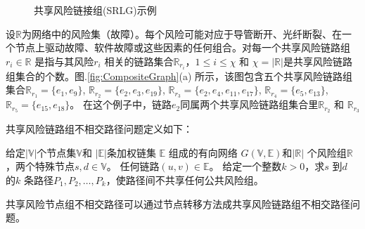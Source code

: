 \begin{figure}[htbp]
\centering
{}
\caption{共享风险链接组(SRLG)示例}\label{fig:SRLGgraph}
\label{fig:Logic shift operation}
\end{figure}

设$\mathbb{R}$为网络中的风险集（故障）。每个风险可能对应于导管断开、光纤断裂、在一个节点上驱动故障、软件故障或这些因素的任何组合。对每一个共享风险链路组$r_i \in \mathbb{R}$ 是指与其风险$r_i$ 相关的链路集合$\mathbb{R}_{r_i}$，$1\leq i\leq \chi$ 和 $\chi=|{\mathbb{R}}|$是共享风险链路组集合的个数。图.\ref{fig:CompositeGraph}(a) 所示，该图包含五个共享风险链路组集合$\mathbb{R}_{r_1}=\{e_1,e_9\}$, $\mathbb{R}_{r_2}=\{e_2,e_3,e_{19}\}$, $\mathbb{R}_{r_3}=\{e_2,e_4,e_{11},e_{17}\}$, $\mathbb{R}_{r_4}=\{e_5,e_{13}\}$, $\mathbb{R}_{r_5}=\{e_{15},e_{18}\}$。 在这个例子中，链路$e_2$同属两个共享风险链路组集合里$\mathbb{R}_{r_2}$ 和 $\mathbb{R}_{r_3}$





共享风险链路组不相交路径问题定义如下：

\begin{definition}[共享风险链路组不相交路径问题]
给定$|\mathbb{V}|$个节点集$\mathbb{V}$和 $|\mathbb{E}|$条加权链集 $\mathbb{E}$ 组成的有向网络 $G(\mathbb{V},\mathbb{E})$和$|\mathbb{R}|$ 个风险组$\mathbb{R}$，两个特殊节点$s,d\in\mathbb{V}$。 任何链路$(u,v)\in\mathbb{E}$。 给定一个整数$k>0$，求$s$ 到$d$ 的$k$ 条路径$P_1,P_2,\ldots,P_k$，使路径间不共享任何公共风险组。
\end{definition}

共享风险节点组不相交路径可以通过节点转移方法成共享风险链路组不相交路径问题。


